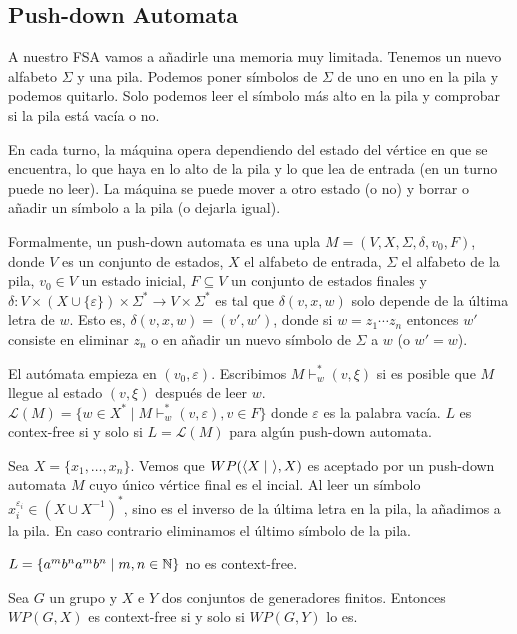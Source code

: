 \documentclass[twoside, 11pt]{article}
\begin{document}
\subsection{Push-down Automata}

A nuestro FSA vamos a añadirle una memoria muy limitada. Tenemos un nuevo alfabeto $\Sigma$ y una pila. Podemos poner símbolos de $\Sigma$ de uno en uno en la pila y podemos quitarlo. Solo podemos leer el símbolo más alto en la pila y comprobar si la pila está vacía o no.

En cada turno, la máquina opera dependiendo del estado del vértice en que se encuentra, lo que haya en lo alto de la pila y lo que lea de entrada (en un turno puede no leer). La máquina se puede mover a otro estado (o no) y borrar o añadir un símbolo a la pila (o dejarla igual).

Formalmente, un push-down automata es una upla $M=(V,X,\Sigma, \delta, v_0, F)$, donde $V$ es un conjunto de estados, $X$ el alfabeto de entrada, $\Sigma$ el alfabeto de la pila, $v_0\in V$ un estado inicial, $F\subseteq V$ un conjunto de estados finales y $\delta:V\times (X\cup\{\varepsilon\})\times\Sigma^*\to V\times\Sigma^*$ es tal que $\delta(v,x,w)$ solo depende de la última letra de $w$. Esto es, $\delta(v,x,w)=(v',w')$, donde si $w=z_1\cdots z_n$ entonces $w'$ consiste en eliminar $z_n$ o en añadir un nuevo símbolo de $\Sigma$ a $w$ (o $w'=w$). 

El autómata empieza en $(v_0,\varepsilon)$. Escribimos $M\vdash_w^* (v,\xi)$ si es posible que $M$ llegue al estado $(v,\xi)$ después de leer $w$. $\mathcal{L}(M)=\{w\in X^*\mid M\vdash_w^* (v,\varepsilon), v\in F\}$ donde $\varepsilon$ es la palabra vacía. $L$ es contex-free si y solo si $L=\mathcal{L}(M)$ para algún push-down automata. 

\begin{ej}
Sea $X=\{x_1,\dots, x_n\}$. Vemos que $WP(\langle{X\mid\ }\rangle, X)$ es aceptado por un push-down automata $M$ cuyo único vértice final es el incial. Al leer un símbolo $x_i^{\varepsilon_i}\in (X\cup X^{-1})^*$, sino es el inverso de la última letra en la pila, la añadimos a la pila. En caso contrario eliminamos el último símbolo de la pila. 
\end{ej}

\begin{ej}
$L=\{a^mb^na^mb^n\mid m,n\in\mathbb{N}\}$ no es context-free. 
\end{ej}

\begin{lemma}
Sea $G$ un grupo y $X$ e $Y$ dos conjuntos de generadores finitos. Entonces $WP(G,X)$ es context-free si y solo si $WP(G,Y)$ lo es. 
\end{lemma}
\end{document}
